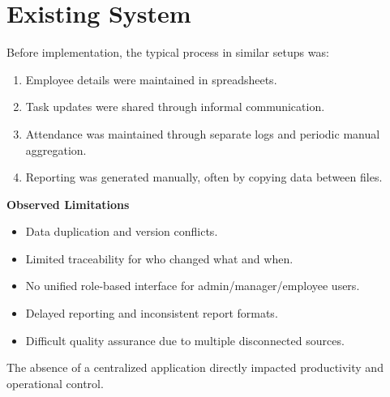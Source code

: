 ﻿\chapter{Existing System}

Before implementation, the typical process in similar setups was:
\begin{enumerate}[leftmargin=1.3cm]
\item Employee details were maintained in spreadsheets.
\item Task updates were shared through informal communication.
\item Attendance was maintained through separate logs and periodic manual aggregation.
\item Reporting was generated manually, often by copying data between files.
\end{enumerate}

\textbf{Observed Limitations}
\begin{itemize}[leftmargin=1.3cm]
\item Data duplication and version conflicts.
\item Limited traceability for who changed what and when.
\item No unified role-based interface for admin/manager/employee users.
\item Delayed reporting and inconsistent report formats.
\item Difficult quality assurance due to multiple disconnected sources.
\end{itemize}

The absence of a centralized application directly impacted productivity and operational control.
